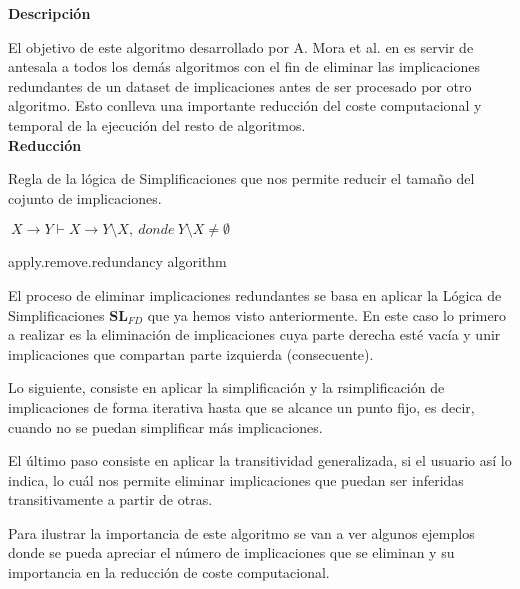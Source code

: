 \textbf{Descripci\'on} 

El objetivo de este algoritmo desarrollado por A. Mora et al. en \cite{Mora2003} es servir de antesala a todos los dem\'as algoritmos con el fin de eliminar las implicaciones redundantes de un dataset de implicaciones antes de ser procesado por otro algoritmo. Esto conlleva una importante reducci\'on del coste computacional y temporal de la ejecuci\'on del resto de algoritmos.\\

\textbf{Reducci\'on}

Regla de la l\'ogica de Simplificaciones que nos permite reducir el tama\~no del cojunto de implicaciones.

\begin{center}
    \(\ X \to Y \vdash X \to Y \setminus X, \ donde \ Y \setminus X \neq \emptyset \)
\end{center} 

\IncMargin{1em}
\begin{algorithm}[H]
    \SetAlgoLined
    \LinesNumbered
    \DontPrintSemicolon
    \caption{apply.remove.redundancy algorithm}\label{alg:1}
\end{algorithm}\DecMargin{1em}
\newpage
El proceso de eliminar implicaciones redundantes se basa en aplicar la L\'ogica de Simplificaciones \(\textbf{SL}_{FD}\) que ya hemos visto anteriormente. En este caso lo primero a realizar es la eliminaci\'on de implicaciones cuya parte derecha est\'e vac\'ia y unir implicaciones que compartan parte izquierda (consecuente).

Lo siguiente, consiste en aplicar la simplificaci\'on y la rsimplificaci\'on de implicaciones de forma iterativa hasta que se alcance un punto fijo, es decir, cuando no se puedan simplificar m\'as implicaciones.

El \'ultimo paso consiste en aplicar la transitividad generalizada, si el usuario as\'i lo indica, lo cu\'al nos permite eliminar implicaciones que puedan ser inferidas transitivamente a partir de otras.

Para ilustrar la importancia de este algoritmo se van a ver algunos ejemplos donde se pueda apreciar el n\'umero de implicaciones que se eliminan y su importancia en la reducci\'on de coste computacional.

